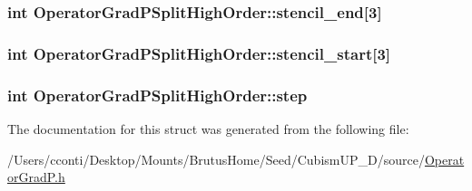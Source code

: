 \subsubsection[{stencil\+\_\+end}]{\setlength{\rightskip}{0pt plus 5cm}int Operator\+Grad\+P\+Split\+High\+Order\+::stencil\+\_\+end\mbox{[}3\mbox{]}}\label{struct_operator_grad_p_split_high_order_a2b1fb9ec48235dc12d35d815661b3a1d}
\hypertarget{struct_operator_grad_p_split_high_order_a2493fb5fd44419dce1219201fe62120b}{}
\subsubsection[{stencil\+\_\+start}]{\setlength{\rightskip}{0pt plus 5cm}int Operator\+Grad\+P\+Split\+High\+Order\+::stencil\+\_\+start\mbox{[}3\mbox{]}}\label{struct_operator_grad_p_split_high_order_a2493fb5fd44419dce1219201fe62120b}
\hypertarget{struct_operator_grad_p_split_high_order_a6fff9a66cc8526d52c945a95ab49668b}{}
\subsubsection[{step}]{\setlength{\rightskip}{0pt plus 5cm}int Operator\+Grad\+P\+Split\+High\+Order\+::step}\label{struct_operator_grad_p_split_high_order_a6fff9a66cc8526d52c945a95ab49668b}


The documentation for this struct was generated from the following file\+:\begin{DoxyCompactItemize}
\item 
/\+Users/cconti/\+Desktop/\+Mounts/\+Brutus\+Home/\+Seed/\+Cubism\+U\+P\+\_\+D/source/\hyperlink{_operator_grad_p_8h}{Operator\+Grad\+P.\+h}\end{DoxyCompactItemize}
